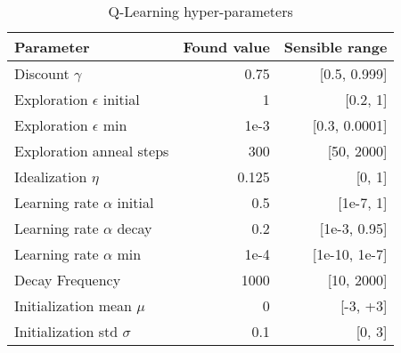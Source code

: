 \documentclass{article}
\begin{document}
\begin{table}[!h]
\centering
\caption{Q-Learning hyper-parameters}
 \label{tab:ql-params}
  
\begin{tabular}{lrr}
Parameter & Found value & Sensible range \\
\midrule
Discount $\gamma$              & 0.75 & [0.5, 0.999]  \\
Exploration $\epsilon$ initial             & 1     & [0.2, 1]              \\
Exploration $\epsilon$ min              & 1e-3      & [0.3, 0.0001]           \\
Exploration anneal steps & 300 & [50, 2000] \\
Idealization $\eta$          & 0.125 & [0, 1] \\
Learning rate $\alpha$ initial              & 0.5 & [1e-7, 1] \\
Learning rate $\alpha$ decay             & 0.2 & [1e-3, 0.95] \\
Learning rate $\alpha$ min               & 1e-4      & [1e-10, 1e-7]        \\
Decay Frequency             & 1000 & [10, 2000] \\
Initialization mean $\mu$ & 0 & [-3, +3] \\
Initialization std $\sigma$ & 0.1 & [0, 3] 
\end{tabular}
\end{table}
\end{document}

